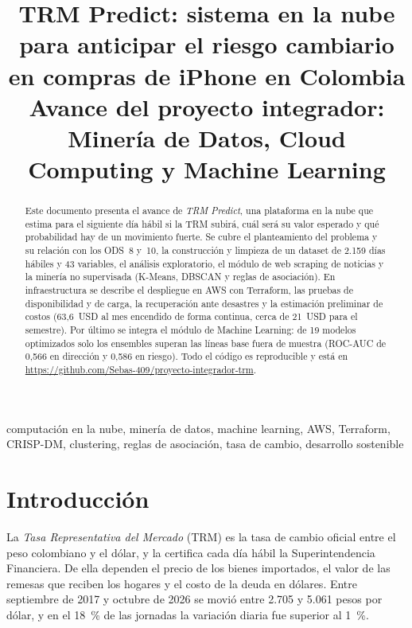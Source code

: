 \documentclass[conference]{IEEEtran}
\begin{document}
\title{TRM Predict: sistema en la nube para anticipar el riesgo cambiario en compras de iPhone en Colombia\\
{\large Avance del proyecto integrador: Minería de Datos, Cloud Computing y Machine Learning}}

\author{
}

\maketitle

\begin{abstract}
Este documento presenta el avance de \emph{TRM Predict}, una plataforma en la nube que estima para el siguiente día hábil si la TRM subirá, cuál será su valor esperado y qué probabilidad hay de un movimiento fuerte. Se cubre el planteamiento del problema y su relación con los ODS~8 y~10, la construcción y limpieza de un dataset de 2.159 días hábiles y 43 variables, el análisis exploratorio, el módulo de web scraping de noticias y la minería no supervisada (K-Means, DBSCAN y reglas de asociación). En infraestructura se describe el despliegue en AWS con Terraform, las pruebas de disponibilidad y de carga, la recuperación ante desastres y la estimación preliminar de costos (63,6~USD al mes encendido de forma continua, cerca de 21~USD para el semestre). Por último se integra el módulo de Machine Learning: de 19 modelos optimizados solo los ensembles superan las líneas base fuera de muestra (ROC-AUC de 0,566 en dirección y 0,586 en riesgo). Todo el código es reproducible y está en \url{https://github.com/Sebas-409/proyecto-integrador-trm}.
\end{abstract}

\begin{IEEEkeywords}
computación en la nube, minería de datos, machine learning, AWS, Terraform, CRISP-DM, clustering, reglas de asociación, tasa de cambio, desarrollo sostenible
\end{IEEEkeywords}

\section{Introducción}
La \emph{Tasa Representativa del Mercado} (TRM) es la tasa de cambio oficial entre el peso colombiano y el dólar, y la certifica cada día hábil la Superintendencia Financiera. De ella dependen el precio de los bienes importados, el valor de las remesas que reciben los hogares y el costo de la deuda en dólares. Entre septiembre de 2017 y octubre de 2026 se movió entre 2.705 y 5.061 pesos por dólar, y en el 18~\% de las jornadas la variación diaria fue superior al 1~\%.
\end{document}
